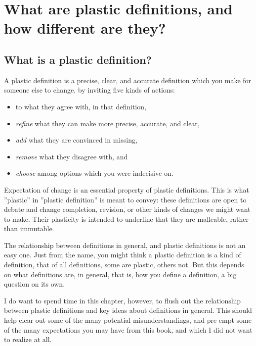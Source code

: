 \chapter{What are plastic definitions, and how different are they?}
\label{c4}



\section{What is a plastic definition?}
\label{c4:s1}
A plastic definition is a precise, clear, and accurate definition which you make for someone else to change, by inviting five kinds of actions: 
\begin{itemize}
	\item to  what they agree with, in that definition,
	\item \textit{refine} what they can make more precise, accurate, and clear,
	\item \textit{add} what they are convinced in missing,
	\item \textit{remove} what they disagree with, and
	\item \textit{choose} among options which you were indecisive on.
\end{itemize}

Expectation of change is an essential property of plastic definitions. This is what ''plastic'' in ''plastic definition'' is meant to convey: these definitions are open to debate and change completion, revision, or other kinds of changes we might want to make. Their plasticity is intended to underline that they are malleable, rather than immutable.

The relationship between definitions in general, and plastic definitions is not an easy one. Just from the name, you might think a plastic definition is a kind of definition, that of all definitions, some are plastic, others not. But this depends on what definitions are, in general, that is, how you define a definition, a big question on its own.

I do want to spend time in this chapter, however, to flush out the relationship between plastic definitions and key ideas about definitions in general. This should help clear out some of the many potential misunderstandings, and pre-empt some of the many expectations you may have from this book, and which I did not want to realize at all.

